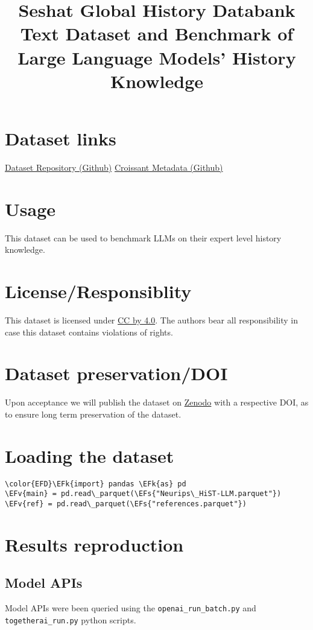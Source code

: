 \documentclass[11pt]{article}
\date{}
\title{Seshat Global History Databank Text Dataset and Benchmark of Large Language Models' History Knowledge}
\newcommand{\EFs}[1]{\textcolor{EFs}{#1}} %
\newcommand{\EFk}[1]{\textcolor{EFk}{#1}} %
\newcommand{\EFv}[1]{\textcolor{EFv}{#1}} %
\begin{document}
\maketitle

\section*{Dataset links}
\label{sec:orgb6a6219}
\href{https://github.com/seshat-db/HiST-LLM}{Dataset Repository (Github)} 
\href{https://github.com/seshat-db/HiST-LLM/blob/main/croissant.json}{Croissant Metadata (Github)}
\section*{Usage}
\label{sec:orge15438e}
This dataset can be used to benchmark LLMs on their expert level history knowledge.
\section*{License/Responsiblity}
\label{sec:org834fc93}
This dataset is licensed under \href{https://creativecommons.org/licenses/by/4.0/}{CC by 4.0}.
The authors bear all responsibility in case this dataset contains violations of rights.
\section*{Dataset preservation/DOI}
\label{sec:orgc0de9d3}
Upon acceptance we will publish the dataset on \href{https://zenodo.org/}{Zenodo} with a respective DOI, as to ensure long term preservation of the dataset.
\section*{Loading the dataset}
\label{sec:org580605e}

\begin{Code}
\begin{Verbatim}
\color{EFD}\EFk{import} pandas \EFk{as} pd
\EFv{main} = pd.read\_parquet(\EFs{"Neurips\_HiST-LLM.parquet"})
\EFv{ref} = pd.read\_parquet(\EFs{"references.parquet"})
\end{Verbatim}
\end{Code}
\section*{Results reproduction}
\label{sec:org87fb86b}
\subsection*{Model APIs}
\label{sec:org64e69d2}
Model APIs were been queried using the \texttt{openai\_run\_batch.py} and \texttt{togetherai\_run.py} python scripts.
\end{document}
